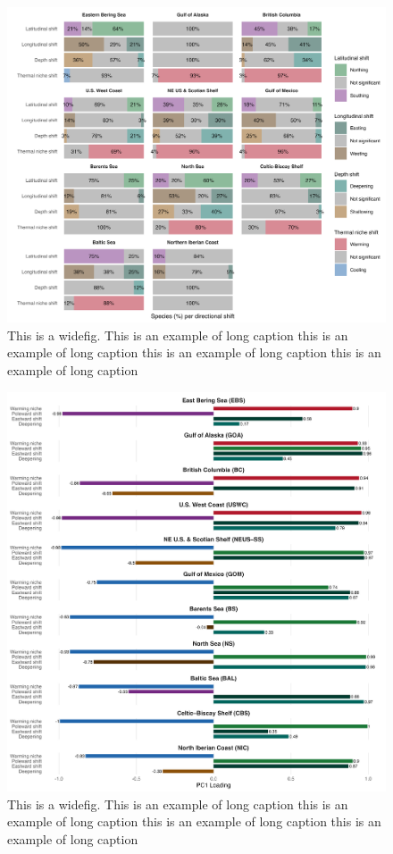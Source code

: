 \documentclass[lineno,pdflatex,sn-nature]{sn-jnl}%
\begin{document}
\begin{appendices}
\begin{figure}[h]
\centering
\includegraphics[width=1\textwidth]{output/figures/supp/prop_significant_supp.png}
\caption{This is a widefig. This is an example of long caption this is an example of long caption  this is an example of long caption this is an example of long caption}\label{fig:prop_significant_supp}
\end{figure}

\begin{figure}[h]
\centering
\includegraphics[width=1\textwidth]{output/figures/supp/pca_loadings_supp.png}
\caption{This is a widefig. This is an example of long caption this is an example of long caption  this is an example of long caption this is an example of long caption}\label{fig:pca_loadings_supp}
\end{figure}


\end{appendices}
\end{document}
